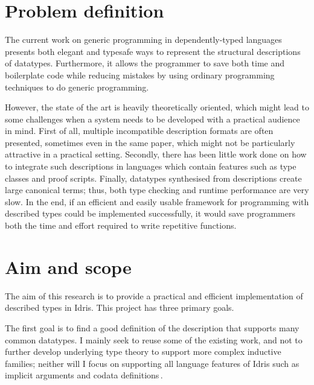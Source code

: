 \documentclass{ituthesis}
\theoremstyle{break}
\begin{document}


\section{Problem definition}
\label{sec:ProblemDefinition}
The current work on generic programming in dependently-typed languages presents both elegant and typesafe ways to represent the structural descriptions of datatypes.
Furthermore, it allows the programmer to save both time and boilerplate code while reducing mistakes by using ordinary programming techniques to do generic programming.

However, the state of the art is heavily theoretically oriented, which might lead to some challenges when a system needs to be developed with a practical audience in mind.
First of all, multiple incompatible description formats are often presented, sometimes even in the same paper, which might not be particularly attractive in a practical setting.
Secondly, there has been little work done on how to integrate such descriptions in languages which contain features such as type classes and proof scripts.
Finally, datatypes synthesised from descriptions create large canonical terms; thus, both type checking and runtime performance are very slow.
In the end, if an efficient and easily usable framework for programming with described types could be implemented successfully, it would save programmers both the time and effort required to write repetitive functions.

\section{Aim and scope}
\label{sec:AimandScope}
The aim of this research is to provide a practical and efficient implementation of described types in Idris.
This project has three primary goals.

The first goal is to find a good definition of the description that supports many common datatypes.
I mainly seek to reuse some of the existing work, and not to further develop underlying type theory to support more complex inductive families; neither will I focus on supporting all language features of Idris such as implicit arguments and codata definitions\,\autocite{idris2014tutorial}.
\end{document}
